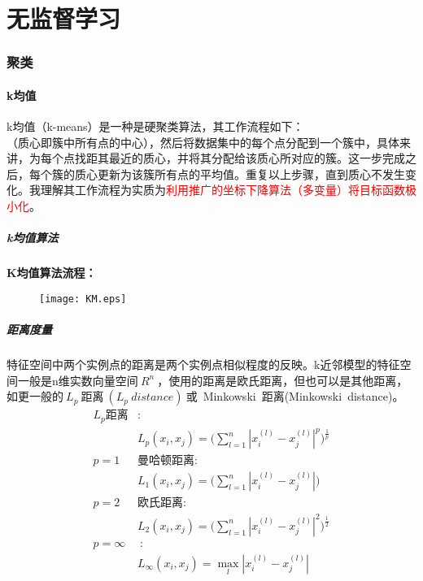 
\part{无监督学习}

\section{聚类}

\subsection{k均值}
k均值（k-means）是一种是硬聚类算法，其工作流程如下： \\（质心即簇中所有点的中心），然后将数据集中的每个点分配到一个簇中，具体来讲，为每个点找距其最近的质心，并将其分配给该质心所对应的簇。这一步完成之后，每个簇的质心更新为该簇所有点的平均值。重复以上步骤，直到质心不发生变化。我理解其工作流程为实质为\textcolor{red}{利用推广的坐标下降算法（多变量）将目标函数极小化}。

\subsubsection{k均值算法}

\noindent\textbf{K均值算法流程：}
\begin{figure}[!h]
  \centering
  \texttt{[image: KM.eps]}
\end{figure}

\subsubsection{距离度量}
特征空间中两个实例点的距离是两个实例点相似程度的反映。k近邻模型的特征空间一般是n维实数向量空间$~R^n~$，使用的距离是欧氏距离，但也可以是其他距离， 如更一般的$~L_p~$距离$~(L_p~distance)~$或~Minkowski~距离(Minkowski~distance)。
\begin{align}
    L_p\text{距离}&: \nonumber\\
    &L_p(x_i,x_j)=\Big(\sum_{l=1}^{n}|x_i^{(l)}-x_j^{(l)}|^p\Big)^{\frac{1}{p}} \nonumber \\
    p=1~~~&\text{曼哈顿距离}:\nonumber \\
    &L_1(x_i,x_j)=\Big(\sum_{l=1}^{n}|x_i^{(l)}-x_j^{(l)}|\Big) \nonumber \\
    p=2~~~&\text{欧氏距离}:\nonumber\\
    &L_2(x_i,x_j)=\Big(\sum_{l=1}^{n}|x_i^{(l)}-x_j^{(l)}|^2\Big)^{\frac{1}{2}} \nonumber \\
    p=\infty~&~:\nonumber\\
    &L_\infty(x_i,x_j)=\max\limits_l |x_i^{(l)}-x_j^{(l)}| \nonumber
\end{align}

